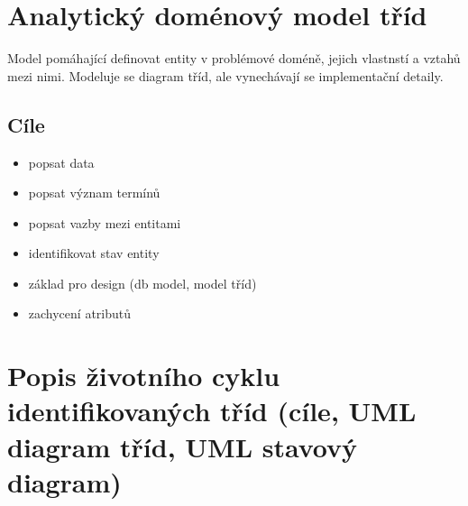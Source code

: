\documentclass{szzclass}
\author{Jakub Rathouský}
\begin{document}
\tableofcontents
\newpage

\section{Analytický doménový model tříd}
Model pomáhající definovat entity v problémové doméně, jejich vlastnstí a vztahů mezi nimi.
Modeluje se diagram tříd, ale vynechávají se implementační detaily.
\subsection{Cíle}
\begin{itemize}
    \item popsat data
    \item popsat význam termínů
    \item popsat vazby mezi entitami
    \item identifikovat stav entity
    \item základ pro design (db model, model tříd)
    \item zachycení atributů
\end{itemize}

\section{Popis životního cyklu identifikovaných tříd (cíle, UML diagram tříd, UML stavový diagram)}
\end{document}
